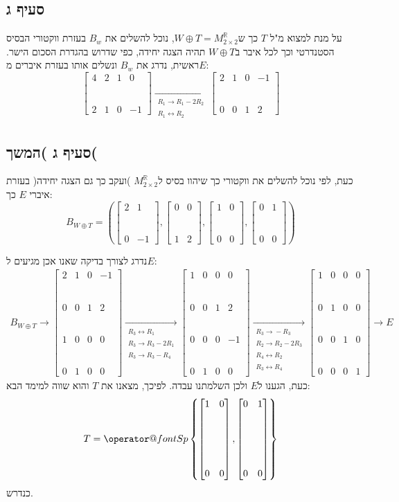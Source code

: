 \documentclass[11pt, oneside]{article}
\makeatletter
\newcommand{\qed}{\R{$\blacksquare$}}
\newcommand{\br}{\\\\\\\\\\\\}
\newcommand{\opr}[1]{\xrightarrow[\text{#1}]{}}
\newcommand{\oprm}[1]{\underset{\substack{#1}}{\longrightarrow}}
\newcommand{\bidiarrow}[1]{\underset{\text{#1}}{\leftrightarrow}}
\newcommand{\mR}{\mathbb{R}}
\newcommand{\m}[3]{\R{משפט #3#2.#1}}
\newcommand{\Sp}[1]{\mathop{\operator@font Sp}#1}
\newcommand{\tot}[4]{\begin{bmatrix}#1 & #2\br#3 & #4\end{bmatrix}}
\makeatother
\begin{document}
\subsection{סעיף ג}
על מנת למצוא מ"ל $T$ כך ש$W \oplus T = M^\mR_{2\times2}$, נוכל להשלים את $B_w$ בעזרת ווקטורי הבסיס הסטנדרטי וכך לכל איבר ב$W \oplus T$ תהיה הצגה יחידה, כפי שדרוש בהגדרת הסכום הישר. ראשית, נדרג את $B_w$ ונשלים אותו בעזרת איברים מ$E$:
\[
\begin{bmatrix}
4 & 2 & 1 & 0\br
2 & 1 & 0 & -1
\end{bmatrix}
\oprm{%
R_1 \opr{} R_1 - 2R_2\\
R_1 \bidiarrow{} R_2
}
\begin{bmatrix}
2 & 1 & 0 & -1\br
0 & 0 & 1 & 2
\end{bmatrix}
\]
\clearpage
\setcounter{subsection}{2}
\subsection{סעיף ג )המשך(}
כעת, לפי \m{8}{3}{5.} נוכל להשלים את ווקטורי כך שיהוו בסיס ל$M^\mR_{2\times2}$ )ועקב כך גם הצגה יחידה( בעזרת איברי $E$ כך:
\[
B_{W \oplus T} = \left(\tot{2}{1}{0}{-1}, \tot{0}{0}{1}{2}, \tot{1}{0}{0}{0}, \tot{0}{1}{0}{0}\right)
\]

נדרג לצורך בדיקה שאנו אכן מגיעים ל$E$:
\begin{align*}
B_{W \oplus T}
\opr{}
\begin{bmatrix}
2 & 1 & 0 & -1\br
0 & 0 & 1 & 2\br
1 & 0 & 0 & 0\br
0 & 1 & 0 & 0
\end{bmatrix}
\oprm{%
R_3 \bidiarrow{} R_1\\
R_3 \opr{} R_3 - 2R_1\\
R_3 \opr{} R_3 - R_4
}
\begin{bmatrix}
1 & 0 & 0 & 0\br
0 & 0 & 1 & 2\br
0 & 0 & 0 & -1\br
0 & 1 & 0 & 0
\end{bmatrix}
\oprm{%
R_3 \opr{} -R_3\\
R_2 \opr{} R_2 - 2R_3\\
R_4 \bidiarrow{} R_2\\
R_3 \bidiarrow{} R_4
}
\begin{bmatrix}
1 & 0 & 0 & 0\br
0 & 1 & 0 & 0\br
0 & 0 & 1 & 0\br
0 & 0 & 0 & 1
\end{bmatrix}
\opr{}
E
\end{align*}
כעת, הגענו ל$E$ ולכן השלמתנו עבדה. לפיכך, מצאנו את $T$ והוא שווה למימד הבא:
\[
T = \Sp \left\{\tot{1}{0}{0}{0}, \tot{0}{1}{0}{0}\right\}
\]
כנדרש.
\br\qed

\end{document}
